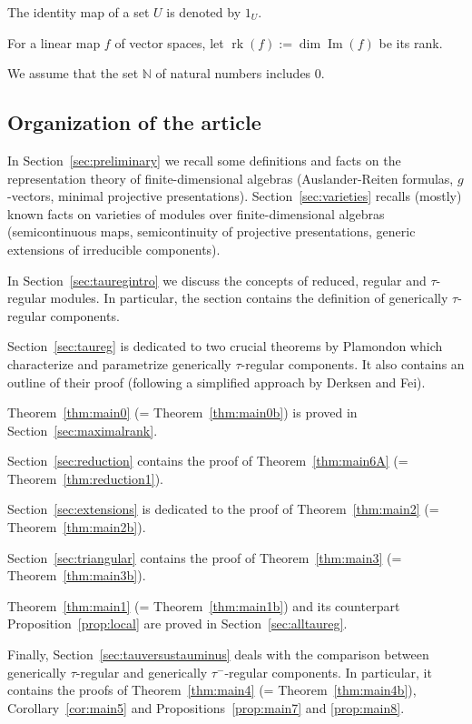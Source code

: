 \documentclass[12pt,reqno]{amsart}
\theoremstyle{definition}
\newcommand{\N}{\mathbb{N}}
\newcommand{\rk}{\operatorname{rk}}
\newcommand{\Ima}{\operatorname{Im}}
\begin{document}
The identity map of a set $U$ is denoted by $1_U$.

For a linear map $f$ of vector spaces, let $\rk(f) := \dim \Ima(f)$
be its rank.

We assume that the set $\N$ of natural numbers includes $0$.

\subsection{Organization of the article}
In
Section~\ref{sec:preliminary} we recall
some definitions and facts on the representation theory of finite-dimensional
algebras (Auslander-Reiten formulas, $g$-vectors, minimal
projective presentations).
Section~\ref{sec:varieties} recalls (mostly) known facts on
varieties of modules over finite-dimensional algebras
(semicontinuous maps,
semicontinuity of projective presentations, generic extensions of irreducible components).

In Section~\ref{sec:tauregintro} we discuss the
concepts of reduced, regular and $\tau$-regular modules.
In particular, the section
contains the definition of generically $\tau$-regular components.

Section~\ref{sec:taureg} is dedicated to
two crucial theorems by Plamondon which characterize and parametrize generically $\tau$-regular components.
It also contains an outline of their proof (following a simplified approach by Derksen and Fei).


Theorem~\ref{thm:main0} (= Theorem~\ref{thm:main0b}) is proved in
Section~\ref{sec:maximalrank}.

Section~\ref{sec:reduction} contains the proof of Theorem~\ref{thm:main6A} (= Theorem~\ref{thm:reduction1}).

Section~\ref{sec:extensions} is dedicated to the proof of Theorem~\ref{thm:main2}
(= Theorem~\ref{thm:main2b}).

Section~\ref{sec:triangular} contains the proof of
Theorem~\ref{thm:main3} (= Theorem~\ref{thm:main3b}).

Theorem~\ref{thm:main1} (= Theorem~\ref{thm:main1b})
and its counterpart
Proposition~\ref{prop:local} are proved in
Section~\ref{sec:alltaureg}.

Finally,
Section~\ref{sec:tauversustauminus} deals with the comparison between
generically $\tau$-regular and generically $\tau^-$-regular components.
In particular, it contains the proofs of
Theorem~\ref{thm:main4} (= Theorem~\ref{thm:main4b}), Corollary~\ref{cor:main5} and Propositions~\ref{prop:main7}
and \ref{prop:main8}.
\end{document}
